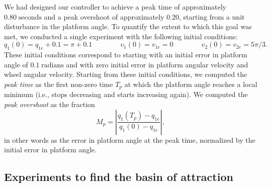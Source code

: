 \documentclass[conf]{new-aiaa}
\begin{document}
We had designed our controller to achieve a peak time of approximately $0.80\;\text{seconds}$ and a peak overshoot of approximately $0.20$, starting from a unit disturbance in the platform angle. To quantify the extent to which this goal was met, we conducted a single experiment with the following initial conditions:
\begin{equation}
q_{1}(0) = q_{1e} + 0.1 = \pi + 0.1
\qquad\qquad
v_{1}(0) = v_{1e} = 0
\qquad\qquad
v_{2}(0) = v_{2e} = 5\pi/3.
\label{eq-peak-ics}
\end{equation}
These initial conditions correspond to starting with an initial error in platform angle of $0.1\;\text{radians}$ and with zero initial error in platform angular velocity and wheel angular velocity.
Starting from these initial conditions, we computed the {\em peak time} as the first non-zero time $T_{p}$ at which the platform angle reaches a local minimum (i.e., stops decreasing and starts increasing again).
We computed the {\em peak overshoot} as the fraction
\begin{equation}
M_{p} = \left\lvert\frac{q_{1}(T_{p}) - q_{1e}}{q_{1}(0) - q_{1e}}\right\rvert,
\end{equation}
in other words as the error in platform angle at the peak time, normalized by the initial error in platform angle.

\subsection{Experiments to find the basin of attraction}
\label{sec-basin}
\end{document}
